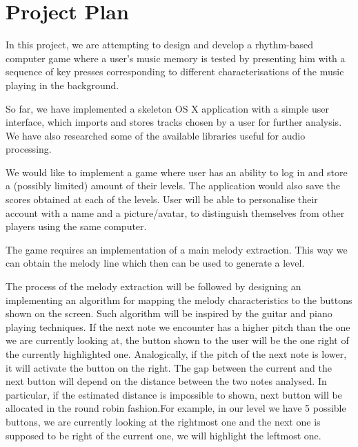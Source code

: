 
\chapter{Project Plan} %

\label{Chapter3} %




In this project, we are attempting to design and develop a rhythm-based computer game where a user's music memory is tested  by presenting him with a sequence of key presses corresponding to different characterisations of the music playing in the background.

So far, we have implemented a skeleton OS X application with a simple user interface, which imports and stores tracks chosen by a user for further analysis. We have also researched some of the available libraries useful for audio processing.

We would like to implement a game where user has an ability to log in and store  a (possibly limited) amount of their levels. The application would also save the scores obtained at each of the levels. User will be able to personalise their account with a name and a picture/avatar, to distinguish themselves from other players using the same computer.

The game requires an implementation of a main melody extraction. This way we can obtain the melody line which then can be used to generate a level.

The process of the melody extraction will be followed by designing an implementing an algorithm for mapping the melody characteristics to the buttons shown on the screen. Such algorithm will be inspired by the guitar and piano playing techniques. If the next note we encounter has a higher pitch than the one we are currently looking at, the button shown to the user will be the one right of the currently highlighted one. Analogically, if the pitch of the next note is lower, it will activate the button on the right. The gap between the current and the next button will depend on the distance between the two notes analysed. In particular, if the estimated distance is impossible to shown, next button will be allocated in the round robin fashion.For example, in our level we have 5 possible buttons, we are currently looking at the rightmost one and the next one is supposed to be right of the current one, we will highlight the leftmost one.

